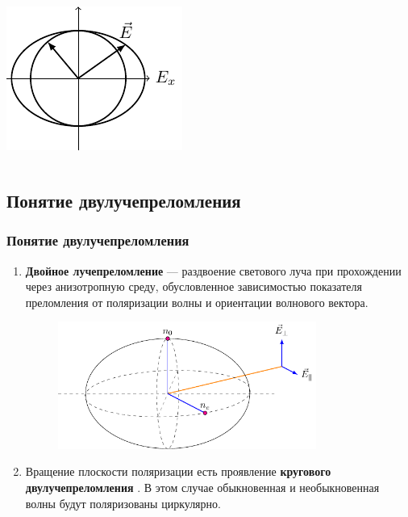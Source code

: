 \documentclass[10pt,pdf,hyperref={unicode}, dvipsnames]{beamer}
\begin{document}
\begin{frame}
\begin{columns}
\begin{column}{0.3\textwidth}
			\includegraphics[width=\textwidth]{images/elleptical_polarisation}
		\end{column}
	\end{columns}
\end{frame}


\begin{frame}[t]
	\subsection{Понятие двулучепреломления}
	\frametitle{Понятие двулучепреломления}
	\begin{enumerate}
		\item \textbf{Двойное лучепреломление} — раздвоение светового луча при прохождении через анизотропную среду, обусловленное зависимостью показателя преломления от поляризации волны и ориентации волнового вектора.\vspace{-1em}
		      \begin{figure}[tb]
			      \centering
			      \includegraphics[width=0.8\textwidth]{images/double}
		      \end{figure}
		\item Вращение плоскости поляризации есть проявление \textbf{кругового двулучепреломления }. В этом случае обыкновенная и необыкновенная волны будут поляризованы циркулярно.
	\end{enumerate}
	
	
\end{frame}
\end{document}
